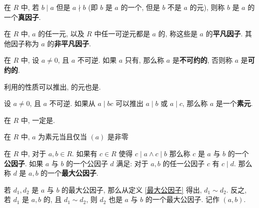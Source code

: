 \begin{definition}\label{真因子}
	在 $R$ 中, 若 $b\mid a$ 但是 $a\nmid b$ (即 $b$ 是 $a$ 的一个, 但是 $b$ 不是 $a$ 的元), 则称 $b$ 是 $a$ 的一个\textbf{真因子}.
\end{definition}

\begin{definition}\label{平凡因子}\label{非平凡因子}
	在 $R$ 中, $a$ 的任一元, 以及 $R$ 中任一可逆元都是 $a$ 的, 称这些是 $a$ 的\textbf{平凡因子}. 其他因子称为 $a$ 的\textbf{非平凡因子}.
\end{definition}

\begin{definition}\label{可约元}\label{不可约元}
	在 $R$ 中, 设 $a\neq 0$, 且 $a$ 不可逆. 如果 $a$ 只有, 那么称 $a$ 是\textbf{不可约的}, 否则称 $a$ 是\textbf{可约的}.
\end{definition}

利用的性质可以推出, 的元也是.

\begin{definition}\label{素元}
	设 $a\neq 0$, 且 $a$ 不可逆. 如果从 $a\mid bc$ 可以推出 $a\mid b$ 或 $a\mid c$, 那么称 $a$ 是一个\textbf{素元}.
\end{definition}

\begin{proposition}
	在 $R$ 中, 一定是.
\end{proposition}

\begin{proposition}
	在 $R$ 中, $a$ 为素元当且仅当 $(a)$ 是非零
\end{proposition}

\begin{definition}\label{公因子}\label{最大公因子}
	在 $R$ 中, 对于 $a,b\in R$. 如果有 $c\in R$ 使得 $c\mid a\wedge c \mid b$ 那么称 $c$ 是 $a$ 与 $b$ 的一个\textbf{公因子}. 如果 $a$ 与 $b$ 的一个公因子 $d$ 满足: 对于 $a,b$ 的任一公因子 $c$ 有 $c\mid d$. 那么称 $d$ 是 $a,b$ 的一个\textbf{最大公因子}.
\end{definition}

\begin{property}
	若 $d_1,d_2$ 是 $a$ 与 $b$ 的最大公因子, 那么从定义 \ref{最大公因子} 得出, $d_1\sim d_2$. 反之, 若 $d_1$ 是 $a,b$ 的, 且 $d_1\sim d_2$, 则 $d_2$ 也是 $a$ 与 $b$ 的一个最大公因子. 记作 $(a,b)$.
\end{property}

